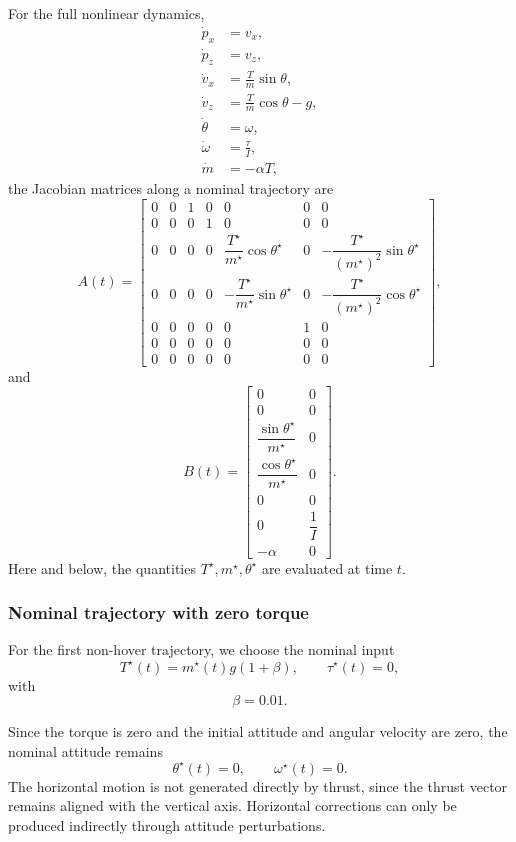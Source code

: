 For the full nonlinear dynamics,
\[
\begin{aligned}
    \dot p_x &= v_x, \\
    \dot p_z &= v_z, \\
    \dot v_x &= \frac{T}{m}\sin\theta, \\
    \dot v_z &= \frac{T}{m}\cos\theta-g, \\
    \dot\theta &= \omega, \\
    \dot\omega &= \frac{\tau}{I}, \\
    \dot m &= -\alpha T,
\end{aligned}
\]
the Jacobian matrices along a nominal trajectory are
\[
A(t)
=
\begin{bmatrix}
0 & 0 & 1 & 0 & 0 & 0 & 0 \\
0 & 0 & 0 & 1 & 0 & 0 & 0 \\
0 & 0 & 0 & 0 &
\dfrac{T^\star}{m^\star}\cos\theta^\star
& 0 &
-\dfrac{T^\star}{(m^\star)^2}\sin\theta^\star \\
0 & 0 & 0 & 0 &
-\dfrac{T^\star}{m^\star}\sin\theta^\star
& 0 &
-\dfrac{T^\star}{(m^\star)^2}\cos\theta^\star \\
0 & 0 & 0 & 0 & 0 & 1 & 0 \\
0 & 0 & 0 & 0 & 0 & 0 & 0 \\
0 & 0 & 0 & 0 & 0 & 0 & 0
\end{bmatrix},
\]
and
\[
B(t)
=
\begin{bmatrix}
0 & 0 \\
0 & 0 \\
\dfrac{\sin\theta^\star}{m^\star} & 0 \\
\dfrac{\cos\theta^\star}{m^\star} & 0 \\
0 & 0 \\
0 & \dfrac{1}{I} \\
-\alpha & 0
\end{bmatrix}.
\]
Here and below, the quantities \(T^\star,m^\star,\theta^\star\) are evaluated at time \(t\).

\subsubsection{Nominal trajectory with zero torque}

For the first non-hover trajectory, we choose the nominal input
\[
    T^\star(t) = m^\star(t)g(1+\beta),
    \qquad
    \tau^\star(t)=0,
\]
with
\[
    \beta = 0.01.
\]

Since the torque is zero and the initial attitude and angular velocity are zero, the nominal attitude remains
\[
    \theta^\star(t)=0,
    \qquad
    \omega^\star(t)=0.
\]
The horizontal motion is not generated directly by thrust, since the thrust vector remains aligned with the vertical axis. Horizontal corrections can only be produced indirectly through attitude perturbations.

